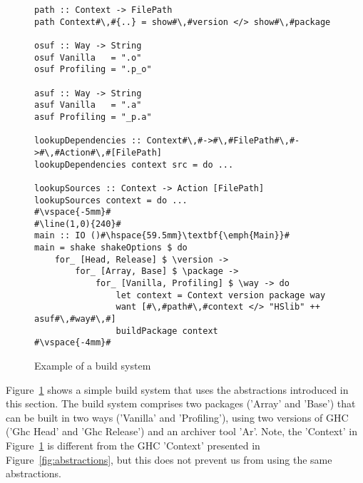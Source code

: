 \begin{figure}
\begin{lstlisting}
path :: Context -> FilePath
path Context#\,#{..} = show#\,#version </> show#\,#package

osuf :: Way -> String
osuf Vanilla   = ".o"
osuf Profiling = ".p_o"

asuf :: Way -> String
asuf Vanilla   = ".a"
asuf Profiling = "_p.a"

lookupDependencies :: Context#\,#->#\,#FilePath#\,#->#\,#Action#\,#[FilePath]
lookupDependencies context src = do ...

lookupSources :: Context -> Action [FilePath]
lookupSources context = do ...
#\vspace{-5mm}#
#\line(1,0){240}#
main :: IO ()#\hspace{59.5mm}\textbf{\emph{Main}}#
main = shake shakeOptions $ do
    for_ [Head, Release] $ \version ->
        for_ [Array, Base] $ \package ->
            for_ [Vanilla, Profiling] $ \way -> do
                let context = Context version package way
                want [#\,#path#\,#context </> "HSlib" ++ asuf#\,#way#\,#]
                buildPackage context
#\vspace{-4mm}#
\end{lstlisting}

\caption{Example of a build system\label{fig:example-abstractions}}
\end{figure}

Figure~\ref{fig:example-abstractions} shows a simple build system that uses the
abstractions introduced in this section.
The build system comprises two packages (\lst'Array' and \lst'Base') that can
be built in two ways (\lst'Vanilla' and \lst'Profiling'), using two versions
of GHC (\lst'Ghc Head' and \lst'Ghc Release') and an archiver tool \lst'Ar'.
Note, the \lst'Context' in Figure~\ref{fig:example-abstractions} is different
from the GHC \lst'Context' presented in Figure~\ref{fig:abstractions}, but
this does not prevent us from using the same abstractions.

